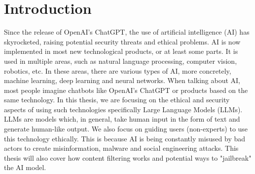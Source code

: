 \chapter{Introduction}


Since the release of OpenAI's ChatGPT, the use of artificial intelligence (AI) has skyrocketed, raising potential security threats and ethical problems. AI is now implemented in most new technological products, or at least some parts. It is used in multiple areas, such as natural language processing, computer vision, robotics, etc. In these areas, there are various types of AI, more concretely, machine learning, deep learning and neural networks. When talking about AI, most people imagine chatbots like OpenAI's ChatGPT or products based on the same technology. In this thesis, we are focusing on the ethical and security aspects of using such technologies specifically Large Language Models (LLMs). LLMs are models which, in general, take human input in the form of text and generate human-like output. We also focus on guiding users (non-experts) to use this technology ethically. This is because AI is being constantly misused by bad actors to create misinformation, malware and social engineering attacks. This thesis will also cover how content filtering works and potential ways to "jailbreak" the AI model.

